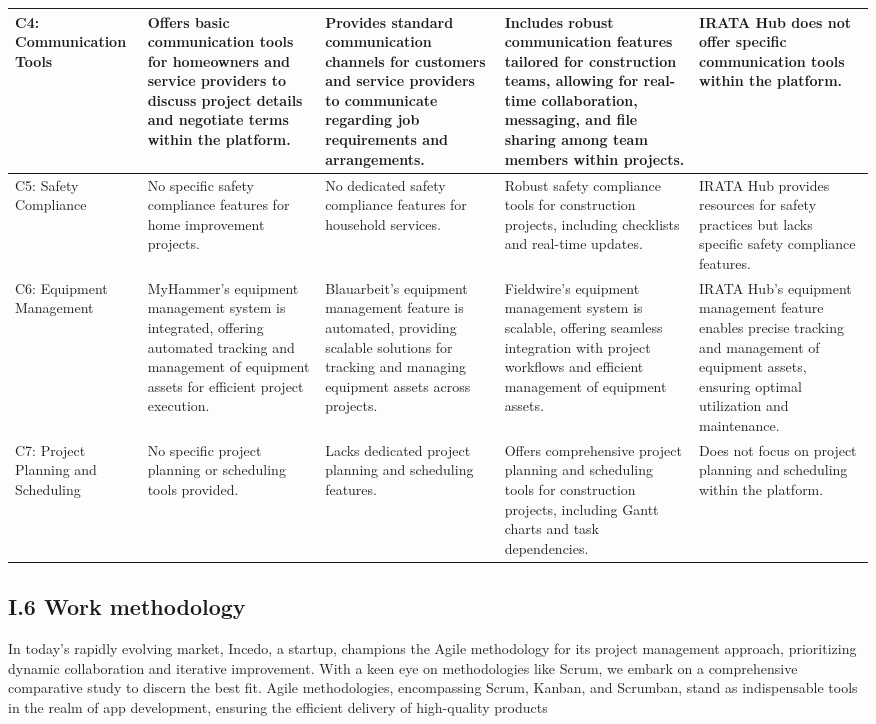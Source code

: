 \begin{longtable}{|p{2.5cm}|p{2.5cm}|p{3.0cm}|p{3.0cm}|p{3.0cm}|}
C4: Communication Tools & Offers basic communication tools for homeowners and service providers to discuss project details and negotiate terms within the platform. & Provides standard communication channels for customers and service providers to communicate regarding job requirements and arrangements. & Includes robust communication features tailored for construction teams, allowing for real-time collaboration, messaging, and file sharing among team members within projects. & IRATA Hub does not offer specific communication tools within the platform. \\
\hline
C5: Safety Compliance & No specific safety compliance features for home improvement projects. & No dedicated safety compliance features for household services. & Robust safety compliance tools for construction projects, including checklists and real-time updates. & IRATA Hub provides resources for safety practices but lacks specific safety compliance features. \\
\hline
C6: Equipment Management & MyHammer's equipment management system is integrated, offering automated tracking and management of equipment assets for efficient project execution. & Blauarbeit's equipment management feature is automated, providing scalable solutions for tracking and managing equipment assets across projects. & Fieldwire's equipment management system is scalable, offering seamless integration with project workflows and efficient management of equipment assets. & IRATA Hub's equipment management feature enables precise tracking and management of equipment assets, ensuring optimal utilization and maintenance. \\
\hline
C7: Project Planning and Scheduling & No specific project planning or scheduling tools provided. & Lacks dedicated project planning and scheduling features. & Offers comprehensive project planning and scheduling tools for construction projects, including Gantt charts and task dependencies. & Does not focus on project planning and scheduling within the platform. \\
\hline
\end{longtable}




\subsection*{I.6 Work methodology}
In today's rapidly evolving market, Incedo, a startup, champions the Agile methodology for its project management approach, prioritizing dynamic collaboration and iterative improvement. With a keen eye on methodologies like Scrum, we embark on a comprehensive comparative study to discern the best fit. Agile methodologies, encompassing Scrum, Kanban, and Scrumban, stand as indispensable tools in the realm of app development, ensuring the efficient delivery of high-quality products


